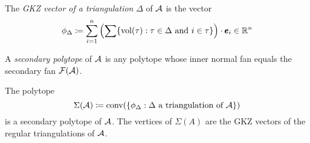 \begin{definition}
    The \textit{GKZ vector of a triangulation} $\Delta$ of $\mathcal{A}$ is the vector
    $$\phi_{\Delta} \coloneqq \sum_{i=1}^n \left( \sum \{\text{vol}(\tau) : \tau \in \Delta \text{ and } i \in \tau \} \right) \cdot \pmb{e}_i \in \mathbb{R}^n$$
\end{definition}

\begin{definition}
    A \textit{secondary polytope} of $\mathcal{A}$ is any polytope whose inner normal fan equals the secondary fan $\mathcal{F}(\mathcal{A})$.
\end{definition}

\begin{theorem}
    The polytope
    $$ \Sigma(\mathcal{A}) \coloneqq \text{conv}(\{ \phi_{\Delta} : \Delta \text{ a triangulation of } \mathcal{A} \} )$$
    is a secondary polytope of $\mathcal{A}$.
    The vertices of $\Sigma(A)$ are the GKZ vectors of the regular triangulations of $\mathcal{A}$.
\end{theorem}
